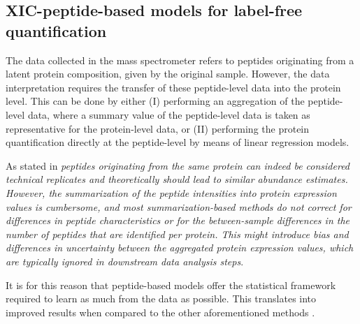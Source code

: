 \subsection{\ac{XIC}-peptide-based models for label-free quantification}
\label{subsec:peptide_model}

The data collected in the mass spectrometer refers to peptides originating from a latent protein composition, given by the original sample. However, the data interpretation requires the transfer of these peptide-level data into the protein level. This can be done by either (I) performing an aggregation of the peptide-level data, where a summary value of the peptide-level data is taken as representative for the protein-level data, or (II) performing the protein quantification directly at the peptide-level by means of linear regression models.

As stated in \cite{Goeminne2015} \textit{peptides originating from the same protein can indeed be considered technical replicates and theoretically should lead to similar abundance estimates. However, the summarization of the peptide intensities into protein expression values is cumbersome, and most summarization-based methods do not correct for differences in peptide characteristics or for the between-sample differences in the number of peptides that are identified per protein. This might introduce bias and differences in uncertainty between the aggregated protein expression values, which are typically ignored in downstream data analysis steps}.

It is for this reason that peptide-based models offer the statistical framework required to learn as much from the data as possible. This translates into improved results when compared to the other aforementioned methods \cite{Goeminne2015}. %
